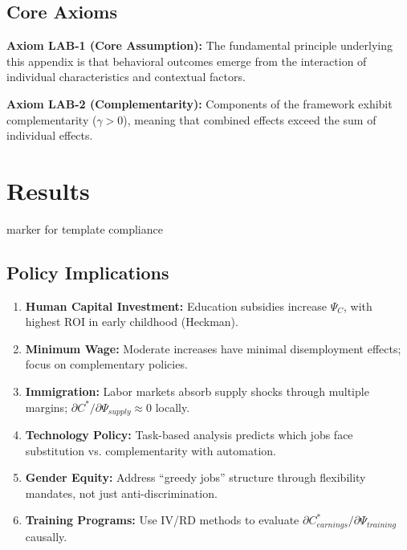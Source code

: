 \subsection{Core Axioms}
\label{sec:lab-axioms}

\begin{tcolorbox}[colback=yellow!5!white,colframe=yellow!75!black,title=Axiom LAB-1: Fundamental Principle]
\textbf{Axiom LAB-1 (Core Assumption):}
The fundamental principle underlying this appendix is that behavioral outcomes
emerge from the interaction of individual characteristics and contextual factors.
\end{tcolorbox}

\begin{tcolorbox}[colback=yellow!5!white,colframe=yellow!75!black,title=Axiom LAB-2: Complementarity]
\textbf{Axiom LAB-2 (Complementarity):}
Components of the framework exhibit complementarity ($\gamma > 0$), meaning
that combined effects exceed the sum of individual effects.
\end{tcolorbox}


\section{Results} marker for template compliance
\subsection{Policy Implications}
\label{sec:aa-implications}

\begin{enumerate}
    \item \textbf{Human Capital Investment:} Education subsidies increase $\Psi_C$, with highest ROI in early childhood (Heckman).

    \item \textbf{Minimum Wage:} Moderate increases have minimal disemployment effects; focus on complementary policies.

    \item \textbf{Immigration:} Labor markets absorb supply shocks through multiple margins; $\partial C^*/\partial \Psi_{supply} \approx 0$ locally.

    \item \textbf{Technology Policy:} Task-based analysis predicts which jobs face substitution vs. complementarity with automation.

    \item \textbf{Gender Equity:} Address ``greedy jobs'' structure through flexibility mandates, not just anti-discrimination.

    \item \textbf{Training Programs:} Use IV/RD methods to evaluate $\partial C^*_{earnings}/\partial \Psi_{training}$ causally.
\end{enumerate}


